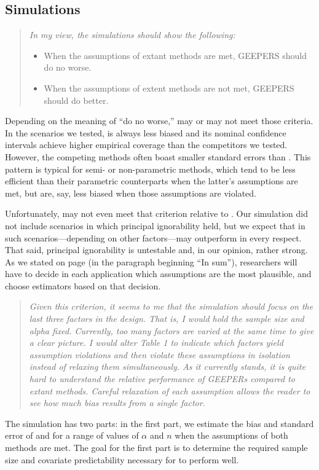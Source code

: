 \documentclass[]{article}
\newenvironment{itquote}
  {\begin{quote} \itshape}
  {\end{quote}\ignorespacesafterend}
\begin{document}
\subsection{Simulations}
\begin{itquote}
    In my view, the simulations should show the following:
\begin{itemize}
   \item When the assumptions of extant methods are met, GEEPERS should do no worse.
   \item When the assumptions of extent methods are not met, GEEPERS should do better.
\end{itemize}
\end{itquote}
Depending on the meaning of ``do no worse,'' \geepers may or may not meet those criteria. 
In the scenarios we tested, \geepers is always less biased and its nominal confidence intervals achieve higher empirical coverage than the competitors we tested.
However, the competing methods often boast smaller standard errors than \geepers. 
This pattern is typical for semi- or non-parametric methods, which tend to be less efficient than their parametric counterparts when the latter's assumptions are met, but are, say, less biased when those assumptions are violated.

Unfortunately, \geepers may not even meet that criterion relative to \psw. Our simulation did not include scenarios in which principal ignorability held, but we expect that in such scenarios---depending on other factors---\psw may outperform \geepers in every respect. 
That said, principal ignorability is untestable and, in our opinion, rather strong. 
As we stated on page \pageref{simsum} (in the paragraph beginning ``In sum''), researchers will have to decide in each application which assumptions are the most plausible, and choose estimators based on that decision. 

\begin{itquote} Given this criterion, it seems to me that the simulation should focus on the last three factors in the design.  That is, I would hold the sample size and alpha fixed.  Currently, too many factors are varied at the same time to give a clear picture.  
I would alter Table 1 to indicate which factors yield assumption violations and then violate these assumptions in isolation instead of relaxing them simultaneously.  As it currently stands, it is quite hard to understand the relative performance of GEEPERs compared to extant methods. Careful relaxation of each assumption allows the reader to see how much bias results from a single factor. 
\end{itquote}
The simulation has two parts: in the first part, we estimate the bias and standard error of \geepers and \pmm for a range of values of $\alpha$ and $n$ when the assumptions of both methods are met.
The goal for the first part is to determine the required sample size and covariate predictability necessary for \geepers to perform well. 
\end{document}
